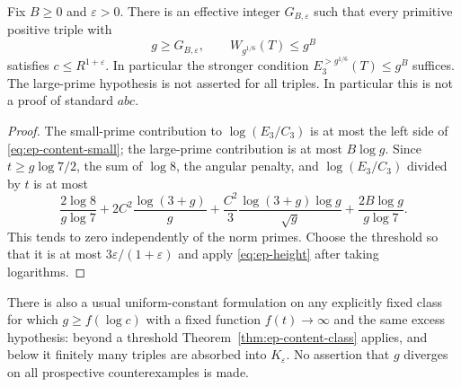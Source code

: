 \begin{theorem}
\label{thm:ep-content-class}
Fix $B\ge0$ and $\varepsilon>0$. There is an effective integer
$G_{B,\varepsilon}$ such that every primitive positive triple with
\[
 g\ge G_{B,\varepsilon},\qquad
 W_{g^{1/6}}(T)\le g^B
\]
satisfies $c\le R^{1+\varepsilon}$. In particular the stronger condition
$E_3^{>g^{1/6}}(T)\le g^B$ suffices. The large-prime hypothesis is not
asserted for all triples. In particular this is not a proof of standard $abc$.
\end{theorem}
\begin{proof}
The small-prime contribution to $\log(E_3/C_3)$ is at most the left side of
\eqref{eq:ep-content-small}; the large-prime contribution is at most
$B\log g$. Since $t\ge g\log7/2$, the sum of $\log8$, the angular penalty,
and $\log(E_3/C_3)$ divided by $t$ is at most
\[
 \frac{2\log8}{g\log7}
 +2C^2\frac{\log(3+g)}g
 +\frac{C^2}{3}\frac{\log(3+g)\log g}{\sqrt g}
 +\frac{2B\log g}{g\log7}.
\]
This tends to zero independently of the norm primes. Choose the threshold
so that it is at most $3\varepsilon/(1+\varepsilon)$ and apply
\eqref{eq:ep-height} after taking logarithms.
\end{proof}

There is also a usual uniform-constant formulation on any explicitly fixed
class for which $g\ge f(\log c)$ with a fixed function $f(t)\to\infty$ and
the same excess hypothesis: beyond a threshold Theorem~\ref{thm:ep-content-class}
applies, and below it finitely many triples are absorbed into $K_\varepsilon$.
No assertion that $g$ diverges on all prospective counterexamples is made.

